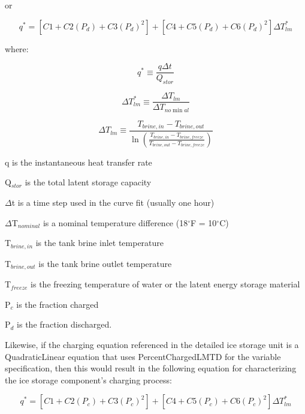 or

\begin{equation}
{q^*} = \left[ {C1 + C2\left( {{P_d}} \right) + C3{{\left( {{P_d}} \right)}^2}} \right] + \left[ {C4 + C5\left( {{P_d}} \right) + C6{{\left( {{P_d}} \right)}^2}} \right]\Delta T_{lm}^*
\end{equation}

where:

\begin{equation}
{q^*} \equiv \frac{{q\Delta t}}{{{Q_{stor}}}}
\end{equation}

\begin{equation}
\Delta T_{lm}^* \equiv \frac{{\Delta {T_{lm}}}}{{\Delta {T_{no\min al}}}}
\end{equation}

\begin{equation}
\Delta {T_{lm}} \equiv \frac{{{T_{brine,in}} - {T_{brine,out}}}}{{\ln \left( {\frac{{{T_{brine,in}} - {T_{brine,freeze}}}}{{{T_{brine,out}} - {T_{brine,freeze}}}}} \right)}}
\end{equation}

q is the instantaneous heat transfer rate

Q\(_{stor}\) is the total latent storage capacity

\(\Delta\)t is a time step used in the curve fit (usually one hour)

\(\Delta\)T\(_{nominal}\) is a nominal temperature difference (18\(^{\circ}\)F = 10\(^{\circ}\)C)

T\(_{brine,in}\) is the tank brine inlet temperature

T\(_{brine,out}\) is the tank brine outlet temperature

T\(_{freeze}\) is the freezing temperature of water or the latent energy storage material

P\(_{c}\) is the fraction charged

P\(_{d}\) is the fraction discharged.

Likewise, if the charging equation referenced in the detailed ice storage unit is a QuadraticLinear equation that uses PercentChargedLMTD for the variable specification, then this would result in the following equation for characterizing the ice storage component's charging process:

\begin{equation}
{q^*} = \left[ {C1 + C2\left( {{P_c}} \right) + C3{{\left( {{P_c}} \right)}^2}} \right] + \left[ {C4 + C5\left( {{P_c}} \right) + C6{{\left( {{P_c}} \right)}^2}} \right]\Delta T_{lm}^*
\end{equation}

